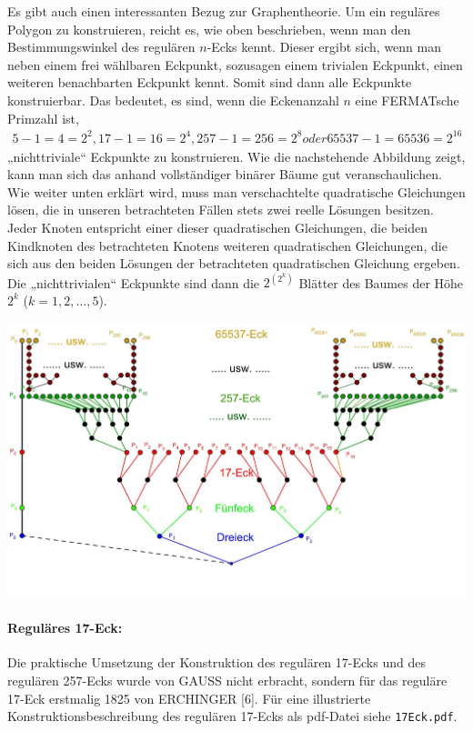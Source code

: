 \documentclass[11pt]{article}
\newcommand{\br}[1]{\ensuremath{\left(#1\right)}}
\begin{document}
Es gibt auch einen interessanten Bezug zur Graphentheorie. Um ein reguläres
Polygon zu konstruieren, reicht es, wie oben beschrieben, wenn man den
Bestimmungswinkel des regulären $n$-Ecks kennt. Dieser ergibt sich, wenn man
neben einem frei wählbaren Eckpunkt, sozusagen einem trivialen Eckpunkt, einen
weiteren benachbarten Eckpunkt kennt. Somit sind dann alle Eckpunkte
konstruierbar. Das bedeutet, es sind, wenn die Eckenanzahl $n$ eine FERMATsche
Primzahl ist, 
\begin{gather*}
  5 - 1 = 4 = 2^2, 17 - 1 = 16 = 2^4, 257 - 1 = 256 = 2^8 oder 65537 - 1 =
  65536 = 2^{16}
\end{gather*}
„nichttriviale“ Eckpunkte zu konstruieren. Wie die nachstehende Abbildung
zeigt, kann man sich das anhand vollständiger binärer Bäume gut
veranschaulichen. Wie weiter unten erklärt wird, muss man verschachtelte
quadratische Gleichungen lösen, die in unseren betrachteten Fällen stets zwei
reelle Lösungen besitzen. Jeder Knoten entspricht einer dieser quadratischen
Gleichungen, die beiden Kindknoten des betrachteten Knotens weiteren
quadratischen Gleichungen, die sich aus den beiden Lösungen der betrachteten
quadratischen Gleichung ergeben. Die „nichttrivialen“ Eckpunkte sind dann die
$2^{\br{2^k}}$ Blätter des Baumes der Höhe $2^k$ ($k = 1,2,\ldots,5$).
\begin{center}
  \includegraphics[width=.7\textwidth]{Baum.jpg}
\end{center}

\paragraph{Reguläres 17-Eck:}
Die praktische Umsetzung der Konstruktion des regulären 17-Ecks und des
regulären 257-Ecks wurde von GAUSS nicht erbracht, sondern für das reguläre
17-Eck erstmalig 1825 von ERCHINGER [6]. Für eine illustrierte
Konstruktionsbeschreibung des regulären 17-Ecks als pdf-Datei siehe
\texttt{17Eck.pdf}.
\end{document}
